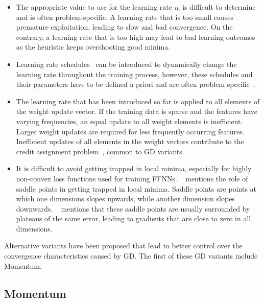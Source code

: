\begin{itemize}
      \item The appropriate value to use for the learning rate $\eta$, is difficult to determine and is often problem-specific. A learning rate that is too small causes premature exploitation, leading to slow and bad convergence. On the contrary, a learning rate that is too high may lead to bad learning outcomes as the heuristic keeps overshooting good minima.

      \item Learning rate schedules~\cite{ref:robbins:1951} can be introduced to dynamically change the learning rate throughout the training process, however, these schedules and their parameters have to be defined a priori and are often problem specific~\cite{ref:darken:1992}.

      \item The learning rate that has been introduced so far is applied to all elements of the weight update vector. If the training data is sparse and the features have varying frequencies, an equal update to all weight elements is inefficient. Larger weight updates are required for less frequently occurring features. Inefficient updates of all elements in the weight vectors contribute to the credit assignment problem~\cite{ref:rumelhart:1986}, common to \acs{GD} variants.

      \item It is difficult to avoid getting trapped in local minima, especially for highly non-convex loss functions used for training \acp{FFNN}. \citeauthor{ref:dauphin:2014}~\cite{ref:dauphin:2014} mentions the role of saddle points in getting trapped in local minima. Saddle points are points at which one dimensions slopes upwards, while another dimension slopes downwards. \citeauthor{ref:ruder:2016}~\cite{ref:ruder:2016} mentions that these saddle points are usually surrounded by plateaus of the same error, leading to gradients that are close to zero in all dimensions.
\end{itemize}

Alternative variants have been proposed that lead to better control over the convergence characteristics caused by \acs{GD}. The first of these \acs{GD} variants include \acs{Momentum}.

\subsection{Momentum}\label{sec:heuristics:gd:momentum}

